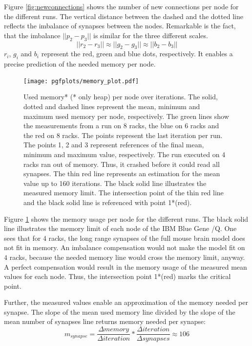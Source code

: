 Figure \ref{fig:newconnections} shows the number of new connections per node for the different runs.
The vertical distance between the dashed and the dotted line reflects the imbalance of synapses between the nodes.
Remarkable is the fact, that the imbalance $||p_2-p_3||$ is similar for the three different scales.
\begin{equation}
	||r_2-r_3|| \approx ||g_2-g_3|| \approx ||b_2-b_3||
\end{equation}
$r_i$, $g_i$ and $b_i$ represent the red, green and blue dots, respectively.
It enables a precise prediction of the needed memory per node.
\begin{figure}[h!]
\begin{center}
 \texttt{[image: pgfplots/memory\_plot.pdf]}
\end{center}
\caption[Used memory* (* only heap) per node over iterations]{Used memory* (* only heap) per node over iterations.
The solid, dotted and dashed lines represent the mean, minimum and maximum used memory per node, respectively.
The green lines show the measurements from a run on 8 racks, the blue on 6 racks and the red on 8 racks.
The points represent the last iteration per run.
The points 1, 2 and 3 represent references of the final mean, minimum and maximum value, respectively.
The run executed on 4 racks ran out of memory. Thus, it crashed before it could read all synapses.
The thin red line represents an estimation for the mean value up to 160 iterations.
The black solid line illustrates the measured memory limit.
The intersection point of the thin red line and the black solid line is referenced with point 1*(red).
 }
\label{fig:memoryplot}
\end{figure}
Figure \ref{fig:memoryplot} shows the memory usage per node for the different runs.
The black solid line illustrates the memory limit of each node of the IBM Blue Gene /Q.
One sees that for 4 racks, the long range synapses of the full mouse brain model does not fit in memory.
An imbalance compensation would not make the model fit on $4$ racks,
because the needed memory line would cross the memory limit, anyway.
A perfect compensation would result in the memory usage of the measured mean values for each node.
Thus, the intersection point 1*(red) marks the critical point.

Further, the measured values enable an approximation of the memory needed per synapse.
The slope of the mean used memory line divided by the slope of the mean number of synapses line returns
memory needed per synapse:
\begin{equation}
	m_{synapse} = \frac{\Delta memory}{\Delta iteration} * \frac{\Delta iteration}{\Delta synapses} \approx 106
\end{equation}

